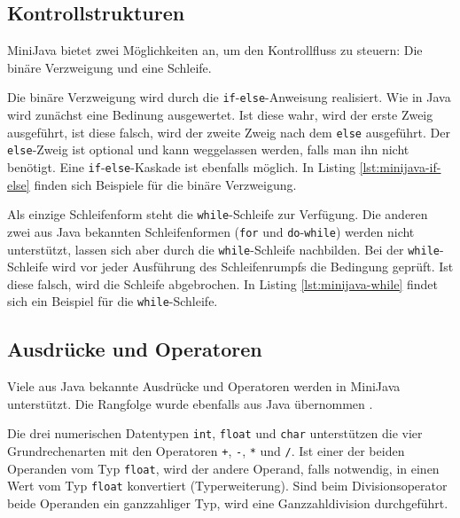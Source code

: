\subsection{Kontrollstrukturen}

MiniJava bietet zwei Möglichkeiten an, um den Kontrollfluss zu steuern: Die binäre Verzweigung und eine Schleife.

Die binäre Verzweigung wird durch die \lstinline{if}-\lstinline{else}-Anweisung realisiert. Wie in Java wird zunächst eine Bedinung ausgewertet. Ist diese wahr, wird der erste Zweig ausgeführt, ist diese falsch, wird der zweite Zweig nach dem \lstinline{else} ausgeführt. Der \lstinline{else}-Zweig ist optional und kann weggelassen werden, falls man ihn nicht benötigt. Eine \lstinline{if}-\lstinline{else}-Kaskade ist ebenfalls möglich. In Listing \ref{lst:minijava-if-else} finden sich Beispiele für die binäre Verzweigung.



Als einzige Schleifenform steht die \lstinline{while}-Schleife zur Verfügung. Die anderen zwei aus Java bekannten Schleifenformen (\lstinline{for} und \lstinline{do}-\lstinline{while}) werden nicht unterstützt, lassen sich aber durch die \lstinline{while}-Schleife nachbilden. Bei der \lstinline{while}-Schleife wird vor jeder Ausführung des Schleifenrumpfs die Bedingung geprüft. Ist diese falsch, wird die Schleife abgebrochen. In Listing \ref{lst:minijava-while} findet sich ein Beispiel für die \lstinline{while}-Schleife.



\subsection{Ausdrücke und Operatoren}

Viele aus Java bekannte Ausdrücke und Operatoren werden in MiniJava unterstützt. Die Rangfolge wurde ebenfalls aus Java übernommen \cite{JavaOperators}.

Die drei numerischen Datentypen \lstinline{int}, \lstinline{float} und \lstinline{char} unterstützen die vier Grundrechenarten mit den Operatoren \lstinline{+}, \lstinline{-}, \lstinline{*} und \lstinline{/}. Ist einer der beiden Operanden vom Typ \lstinline{float}, wird der andere Operand, falls notwendig, in einen Wert vom Typ \lstinline{float} konvertiert (Typerweiterung). Sind beim Divisionsoperator beide Operanden ein ganzzahliger Typ, wird eine Ganzzahldivision durchgeführt.

